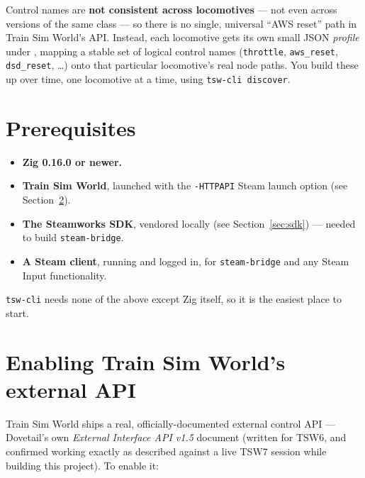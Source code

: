 \documentclass[11pt,a4paper]{article}
\newcommand{\code}[1]{\texttt{#1}}
\begin{document}
Control names are \textbf{not consistent across locomotives} --- not even
across versions of the same class --- so there is no single, universal
``AWS reset'' path in Train Sim World's API. Instead, each locomotive gets
its own small JSON \emph{profile} under , mapping a stable
set of logical control names (\code{throttle}, \code{aws\_reset},
\code{dsd\_reset}, \ldots) onto that particular locomotive's real node
paths. You build these up over time, one locomotive at a time, using
\code{tsw-cli discover}.

\section{Prerequisites}

\begin{itemize}[leftmargin=1.5em]
    \item \textbf{Zig 0.16.0 or newer.}
    \item \textbf{Train Sim World}, launched with the \code{-HTTPAPI}
    Steam launch option (see Section~\ref{sec:tsw-api}).
    \item \textbf{The Steamworks SDK}, vendored locally (see
    Section~\ref{sec:sdk}) --- needed to build \code{steam-bridge}.
    \item \textbf{A Steam client}, running and logged in, for
    \code{steam-bridge} and any Steam Input functionality.
\end{itemize}

\code{tsw-cli} needs none of the above except Zig itself, so it is the
easiest place to start.

\section{Enabling Train Sim World's external API}
\label{sec:tsw-api}

Train Sim World ships a real, officially-documented external control API
--- Dovetail's own \emph{External Interface API v1.5} document (written
for TSW6, and confirmed working exactly as described against a live TSW7
session while building this project). To enable it:
\end{document}
